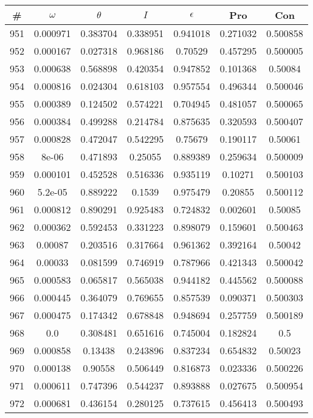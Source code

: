 \newpage
\begin{table}
\begin{tabular}{c|c|c|c|c|c|c}
\# & $\omega$ & $\theta$ & $I$ & $\epsilon$ & Pro & Con\\
\hline
951 & 0.000971 & 0.383704 & 0.338951 & 0.941018 & 0.271032 & 0.500858\\
952 & 0.000167 & 0.027318 & 0.968186 & 0.70529 & 0.457295 & 0.500005\\
953 & 0.000638 & 0.568898 & 0.420354 & 0.947852 & 0.101368 & 0.50084\\
954 & 0.000816 & 0.024304 & 0.618103 & 0.957554 & 0.496344 & 0.500046\\
955 & 0.000389 & 0.124502 & 0.574221 & 0.704945 & 0.481057 & 0.500065\\
956 & 0.000384 & 0.499288 & 0.214784 & 0.875635 & 0.320593 & 0.500407\\
957 & 0.000828 & 0.472047 & 0.542295 & 0.75679 & 0.190117 & 0.50061\\
958 & 8e-06 & 0.471893 & 0.25055 & 0.889389 & 0.259634 & 0.500009\\
959 & 0.000101 & 0.452528 & 0.516336 & 0.935119 & 0.10271 & 0.500103\\
960 & 5.2e-05 & 0.889222 & 0.1539 & 0.975479 & 0.20855 & 0.500112\\
961 & 0.000812 & 0.890291 & 0.925483 & 0.724832 & 0.002601 & 0.50085\\
962 & 0.000362 & 0.592453 & 0.331223 & 0.898079 & 0.159601 & 0.500463\\
963 & 0.00087 & 0.203516 & 0.317664 & 0.961362 & 0.392164 & 0.50042\\
964 & 0.00033 & 0.081599 & 0.746919 & 0.787966 & 0.421343 & 0.500042\\
965 & 0.000583 & 0.065817 & 0.565038 & 0.944182 & 0.445562 & 0.500088\\
966 & 0.000445 & 0.364079 & 0.769655 & 0.857539 & 0.090371 & 0.500303\\
967 & 0.000475 & 0.174342 & 0.678848 & 0.948694 & 0.257759 & 0.500189\\
968 & 0.0 & 0.308481 & 0.651616 & 0.745004 & 0.182824 & 0.5\\
969 & 0.000858 & 0.13438 & 0.243896 & 0.837234 & 0.654832 & 0.50023\\
970 & 0.000138 & 0.90558 & 0.506449 & 0.816873 & 0.023336 & 0.500226\\
971 & 0.000611 & 0.747396 & 0.544237 & 0.893888 & 0.027675 & 0.500954\\
972 & 0.000681 & 0.436154 & 0.280125 & 0.737615 & 0.456413 & 0.500493\\

\end{tabular}
\end{table}
